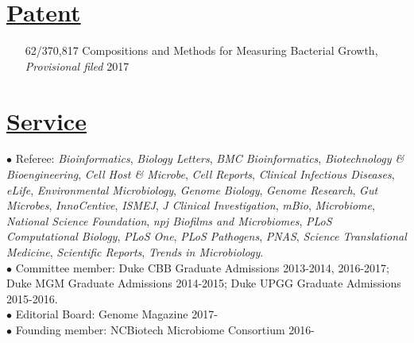 \documentclass[overlapped,line,11pt]{res}
\begin{document}
\begin{resume}
\section{\underline{\sc Patent}} 
\vspace{.25in} 
\begin{itemize}[leftmargin=2cm, style=sameline, itemsep=0mm]
\item[62/370,817] Compositions and Methods for Measuring Bacterial Growth, \emph{Provisional filed} 2017
\end{itemize}


\section{\underline{\sc Service}}
\vspace{.05in}

\hangindent=0.5in $\bullet$\hspace{.1in} Referee:
\emph{Bioinformatics}, \emph{Biology Letters}, \emph{BMC
  Bioinformatics}, \emph{Biotechnology \& Bioengineering}, \emph{Cell
  Host \& Microbe}, \emph{Cell Reports}, \emph{Clinical Infectious
  Diseases}, \emph{eLife}, \emph{Environmental Microbiology},
\emph{Genome Biology}, \emph{Genome Research}, \emph{Gut Microbes},
\emph{InnoCentive}, \emph{ISMEJ}, \emph{J Clinical Investigation},
\emph{mBio}, \emph{Microbiome}, \emph{National Science Foundation},
\emph{npj Biofilms and Microbiomes}, \emph{PLoS Computational
  Biology}, \emph{PLoS One}, \emph{PLoS Pathogens}, \emph{PNAS},
\emph{Science Translational Medicine}, \emph{Scientific Reports},
\emph{Trends in Microbiology}. \\

\vspace{-10mm} \hangindent=0.5in $\bullet$\hspace{.1in} Committee
member: Duke CBB Graduate Admissions 2013-2014, 2016-2017; Duke MGM Graduate
Admissions 2014-2015; Duke UPGG Graduate Admissions 2015-2016. \\

\vspace{-10mm}
\hangindent=0.5in $\bullet$\hspace{.1in} Editorial Board: Genome Magazine
2017- \\

\vspace{-10mm}
\hangindent=0.5in $\bullet$\hspace{.1in} Founding member: NCBiotech
Microbiome Consortium
2016- \\


\end{resume}
\end{document}

